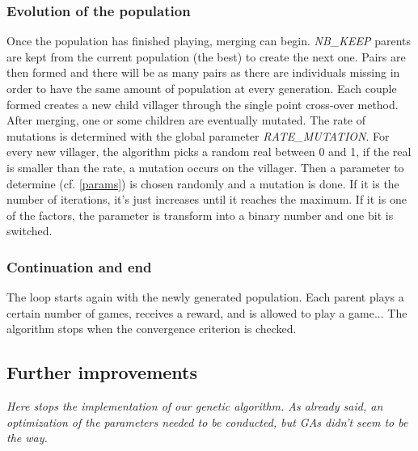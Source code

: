 \documentclass[11pt,a4paper]{article}
\begin{document}
\begin{appendices}
\subsubsection{Evolution of the population}
Once the population has finished playing, merging can begin. \textit{NB\_KEEP} parents are kept from the current population (the best) to create the next one. Pairs are then formed and there will be as many pairs as there are individuals missing in order to have the same amount of population at every generation. Each couple formed creates a new child villager through the single point cross-over method.\\
After merging, one or some children are eventually mutated. The rate of mutations is determined with the global parameter \textit{RATE\_MUTATION}. For every new villager, the algorithm picks a random real between 0 and 1, if the real is smaller than the rate, a mutation occurs on the villager. Then a parameter to determine (cf. \ref{params})
is chosen randomly and a mutation is done. If it is the number of iterations, it's just increases until it reaches the maximum. If it is one of the factors, the parameter is transform into a binary number and one bit is switched.
\subsubsection{Continuation and end}
The loop starts again with the newly generated population. Each parent plays a certain number of games, receives a reward, and is allowed to play a game... The algorithm stops when the convergence criterion is checked. 
\subsection{Further improvements}
\textit{Here stops the implementation of our genetic algorithm. As already said, an optimization of the parameters needed to be conducted, but GAs didn't seem to be the way.}

\end{appendices}
\end{document}
